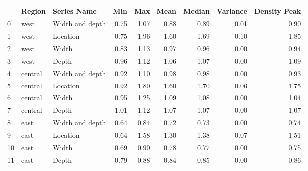 \begin{tabular}{lllrrrrrr}
\toprule
{} &   Region &      Series Name &   Min &   Max &  Mean &  Median &  Variance &  Density Peak \\
\midrule
0  &     west &  Width and depth &  0.75 &  1.07 &  0.88 &    0.89 &      0.01 &          0.90 \\
1  &     west &         Location &  0.75 &  1.96 &  1.60 &    1.69 &      0.10 &          1.85 \\
2  &     west &            Width &  0.83 &  1.13 &  0.97 &    0.96 &      0.00 &          0.94 \\
3  &     west &            Depth &  0.96 &  1.12 &  1.06 &    1.07 &      0.00 &          1.09 \\
4  &  central &  Width and depth &  0.92 &  1.10 &  0.98 &    0.98 &      0.00 &          0.93 \\
5  &  central &         Location &  0.92 &  1.80 &  1.60 &    1.70 &      0.06 &          1.75 \\
6  &  central &            Width &  0.95 &  1.25 &  1.09 &    1.08 &      0.00 &          1.04 \\
7  &  central &            Depth &  1.01 &  1.12 &  1.07 &    1.07 &      0.00 &          1.07 \\
8  &     east &  Width and depth &  0.64 &  0.84 &  0.72 &    0.73 &      0.00 &          0.74 \\
9  &     east &         Location &  0.64 &  1.58 &  1.30 &    1.38 &      0.07 &          1.51 \\
10 &     east &            Width &  0.69 &  0.90 &  0.78 &    0.77 &      0.00 &          0.75 \\
11 &     east &            Depth &  0.79 &  0.88 &  0.84 &    0.85 &      0.00 &          0.86 \\
\bottomrule
\end{tabular}
